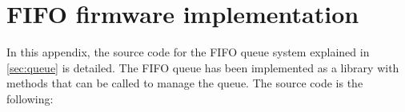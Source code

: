 \chapter{FIFO firmware implementation} \label{app:fifo}

In this appendix, the source code for the FIFO queue system explained in \cref{sec:queue} is detailed. The FIFO queue has been implemented as a library with methods that can be called to manage the queue. The source code is the following:

 \newpage
{}